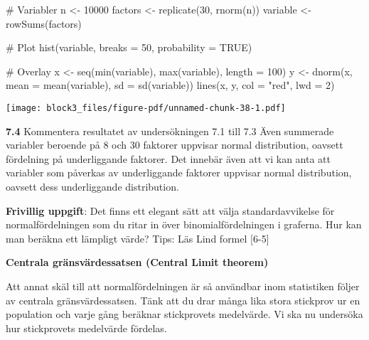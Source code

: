 \documentclass[
  letterpaper,
  DIV=11,
  numbers=noendperiod]{scrartcl}
\newenvironment{Shaded}{\begin{snugshade}}{\end{snugshade}}
\newcommand{\AttributeTok}[1]{\textcolor[rgb]{0.40,0.45,0.13}{#1}}
\newcommand{\CommentTok}[1]{\textcolor[rgb]{0.37,0.37,0.37}{#1}}
\newcommand{\ConstantTok}[1]{\textcolor[rgb]{0.56,0.35,0.01}{#1}}
\newcommand{\DecValTok}[1]{\textcolor[rgb]{0.68,0.00,0.00}{#1}}
\newcommand{\FunctionTok}[1]{\textcolor[rgb]{0.28,0.35,0.67}{#1}}
\newcommand{\NormalTok}[1]{\textcolor[rgb]{0.00,0.23,0.31}{#1}}
\newcommand{\OtherTok}[1]{\textcolor[rgb]{0.00,0.23,0.31}{#1}}
\newcommand{\StringTok}[1]{\textcolor[rgb]{0.13,0.47,0.30}{#1}}
\begin{document}
\begin{Shaded}
\begin{Highlighting}[]
\CommentTok{\# Variabler}
\NormalTok{n }\OtherTok{\textless{}{-}} \DecValTok{10000}
\NormalTok{factors }\OtherTok{\textless{}{-}} \FunctionTok{replicate}\NormalTok{(}\DecValTok{30}\NormalTok{, }\FunctionTok{rnorm}\NormalTok{(n))}
\NormalTok{variable }\OtherTok{\textless{}{-}} \FunctionTok{rowSums}\NormalTok{(factors)}

\CommentTok{\# Plot}
\FunctionTok{hist}\NormalTok{(variable, }\AttributeTok{breaks =} \DecValTok{50}\NormalTok{, }\AttributeTok{probability =} \ConstantTok{TRUE}\NormalTok{)}

\CommentTok{\# Overlay}
\NormalTok{x }\OtherTok{\textless{}{-}} \FunctionTok{seq}\NormalTok{(}\FunctionTok{min}\NormalTok{(variable), }\FunctionTok{max}\NormalTok{(variable), }\AttributeTok{length =} \DecValTok{100}\NormalTok{)}
\NormalTok{y }\OtherTok{\textless{}{-}} \FunctionTok{dnorm}\NormalTok{(x, }\AttributeTok{mean =} \FunctionTok{mean}\NormalTok{(variable), }\AttributeTok{sd =} \FunctionTok{sd}\NormalTok{(variable))}
\FunctionTok{lines}\NormalTok{(x, y, }\AttributeTok{col =} \StringTok{"red"}\NormalTok{, }\AttributeTok{lwd =} \DecValTok{2}\NormalTok{)}
\end{Highlighting}
\end{Shaded}

\texttt{[image: block3\_files/figure-pdf/unnamed-chunk-38-1.pdf]}

\textbf{7.4} Kommentera resultatet av undersökningen 7.1 till 7.3 Även
summerade variabler beroende på 8 och 30 faktorer uppvisar normal
distribution, oavsett fördelning på underliggande faktorer. Det innebär
även att vi kan anta att variabler som påverkas av underliggande
faktorer uppvisar normal distribution, oavsett dess underliggande
distribution.

\textbf{Frivillig uppgift}: Det finns ett elegant sätt att välja
standardavvikelse för normalfördelningen som du ritar in över
binomialfördelningen i graferna. Hur kan man beräkna ett lämpligt värde?
Tips: Läs Lind formel {[}6-5{]}

\textbf{Centrala gränsvärdessatsen (Central Limit theorem)}

Att annat skäl till att normalfördelningen är så användbar inom
statistiken följer av centrala gränsvärdessatsen. Tänk att du drar många
lika stora stickprov ur en population och varje gång beräknar
stickprovets medelvärde. Vi ska nu undersöka hur stickprovets medelvärde
fördelas.
\end{document}
